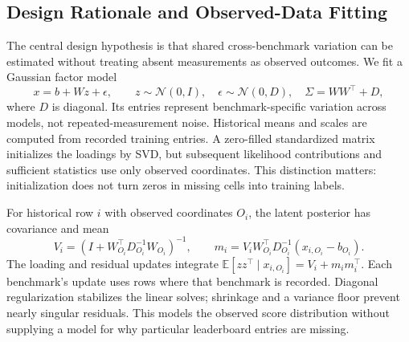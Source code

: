 \documentclass{article}
\begin{document}
\subsection{Design Rationale and Observed-Data Fitting}
The central design hypothesis is that shared cross-benchmark variation can be estimated without treating absent measurements as observed outcomes. We fit a Gaussian factor model
\begin{equation}
 x=b+Wz+\epsilon,\qquad z\sim\mathcal N(0,I),\quad
 \epsilon\sim\mathcal N(0,D),\quad \Sigma=WW^\top+D,
 \label{eq:factor}
\end{equation}
where $D$ is diagonal. Its entries represent benchmark-specific variation across models, not repeated-measurement noise. Historical means and scales are computed from recorded training entries. A zero-filled standardized matrix initializes the loadings by SVD, but subsequent likelihood contributions and sufficient statistics use only observed coordinates. This distinction matters: initialization does not turn zeros in missing cells into training labels.

For historical row $i$ with observed coordinates $O_i$, the latent posterior has covariance and mean
\begin{equation}
 V_i=(I+W_{O_i}^{\top}D_{O_i}^{-1}W_{O_i})^{-1},\qquad
 m_i=V_iW_{O_i}^{\top}D_{O_i}^{-1}(x_{i,O_i}-b_{O_i}).
 \label{eq:posterior}
\end{equation}
The loading and residual updates integrate $\mathbb E[zz^\top\mid x_{i,O_i}]=V_i+m_im_i^\top$. Each benchmark's update uses rows where that benchmark is recorded. Diagonal regularization stabilizes the linear solves; shrinkage and a variance floor prevent nearly singular residuals. This models the observed score distribution without supplying a model for why particular leaderboard entries are missing.
\end{document}
